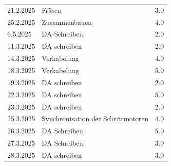 \begin{longtable}{|l|p{10cm}|r|}
    21.2.2025	&   Fräsen	&	3.0\\
    25.2.2025	&	Zusammenbauen	&	4.0\\
    6.5.2025	&	DA-Schreiben	&	2.0\\
    11.3.2025	&	DA-schreiben	&	2.0\\
    14.3.2025	&	Verkabelung     &	4.0\\
    18.3.2025	&	Verkabelung	&	5.0\\
    19.3.2025   &   DA schreiben    &   2.0 \\
    22.3.2025   &   DA schreiben    &   5.0 \\
    23.3.2025   &   DA schreiben    &   2.0 \\
    25.3.2025	&	Synchronisation der Schrittmotoren	&	4.0\\
    26.3.2025   &   DA Schreiben    &   5.0 \\
    27.3.2025   &   DA Schreiben    &   3.0 \\
    28.3.2025	&	DA schreiben	&	3.0\\
\end{longtable}
\newpage

